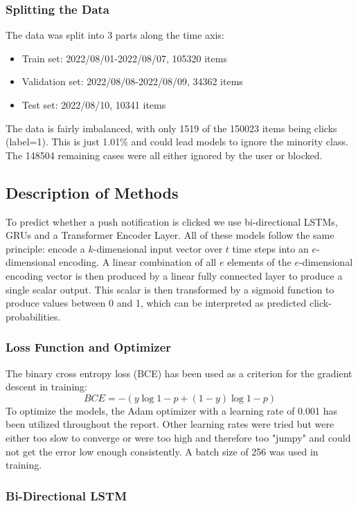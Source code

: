 \documentclass[utf8x]{ctexart}
\begin{document}
\subsubsection{Splitting the Data}

The data was split into 3 parts along the time axis:
\begin{itemize}
  \item Train set: 2022/08/01-2022/08/07, 105320 items
  \item Validation set: 2022/08/08-2022/08/09, 34362 items
  \item Test set: 2022/08/10, 10341 items
\end{itemize}
The data is fairly imbalanced, with only 1519 of the 150023 items being clicks (label=1). This is just 1.01\% and could lead models to ignore the minority class. The 148504 remaining cases were all either ignored by the user or blocked.

\subsection{Description of Methods}

To predict whether a push notification is clicked we use bi-directional LSTMs, GRUs and a Transformer Encoder Layer.
All of these models follow the same principle: encode a $k$-dimensional input vector over $t$ time steps into an $e$-dimensional encoding. A linear combination of all $e$ elements of the $e$-dimensional encoding vector is then produced by a linear fully connected layer to produce a single scalar output. This scalar is then transformed by a sigmoid function to produce values between 0 and 1, which can be interpreted as predicted click-probabilities.

\subsubsection{Loss Function and Optimizer}

The binary cross entropy loss (BCE) has been used as a criterion for the gradient descent in training:
\[ BCE = -(y\log{1-p}+(1-y)\log{1-p}) \]
To optimize the models, the Adam optimizer with a learning rate of 0.001 has been utilized throughout the report. Other learning rates were tried but were either too slow to converge or were too high and therefore too "jumpy" and could not get the error low enough consistently. A batch size of 256 was used in training.

\subsubsection{Bi-Directional LSTM}
\end{document}
